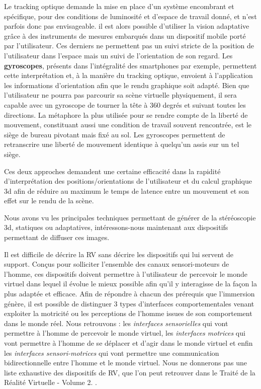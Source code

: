 Le tracking optique demande la mise en place d'un système encombrant et spécifique, pour des conditions de luminosité et d'espace de travail donné, et n'est parfois donc pas envisageable. il est alors possible d'utiliser la vision adaptative grâce à des instruments de mesures embarqués dans un dispositif mobile porté par l'utilisateur. Ces derniers ne permettent pas un suivi stricte de la position de l'utilisateur dans l'espace mais un suivi de l'orientation de son regard. Les \textbf{gyroscopes}, présents dans l'intégralité des smartphones par exemple, permettent cette interprétation et, à la manière du tracking optique, envoient à l'application les informations d'orientation afin que le rendu graphique soit adapté. Bien que l'utilisateur ne pourra pas parcourir sa scène virtuelle physiquement, il sera capable avec un gyroscope de tourner la tête à 360 degrés et suivant toutes les directions. La métaphore la plus utilisée pour se rendre compte de la liberté de mouvement, constituant aussi une condition de travail souvent rencontrée, est le siège de bureau pivotant mais fixé au sol. Les gyroscopes permettent de retranscrire une liberté de mouvement identique à quelqu'un assis sur un tel siège. 

Ces deux approches demandent une certaine efficacité dans la rapidité d'interprétation des positions/orientations de l'utilisateur et du calcul graphique 3d afin de réduire au maximum le temps de latence entre un mouvement et son effet sur le rendu de la scène.  

Nous avons vu les principales techniques permettant de générer de la stéréoscopie 3d, statiques ou adaptatives, intéressons-nous maintenant aux dispositifs permettant de diffuser ces images.

 \label{dispositifs_RV}


Il est difficile de décrire la RV sans décrire les dispositifs qui lui servent de support. Conçus pour solliciter l'ensemble des canaux sensori-moteurs de l'homme, ces dispositifs doivent permettre à l'utilisateur de percevoir le monde virtuel dans lequel il évolue le mieux possible afin qu'il y interagisse de la façon la plus adaptée et efficace.
Afin de répondre à chacun des prérequis que l'immersion génère, il est possible de distinguer 3 types d'interfaces comportementales venant exploiter la motricité ou les perceptions de l'homme issues de son comportement dans le monde réel.
Nous retrouvons : les \textit{interfaces sensorielles} qui vont permettre à l'homme de percevoir le monde virtuel, les \textit{interfaces motrices} qui vont permettre à l'homme de se déplacer et d'agir dans le monde virtuel et enfin les \textit{interfaces sensori-motrices} qui vont permettre une communication bidirectionnelle entre l'homme et le monde virtuel.
Nous ne donnerons pas une liste exhaustive des dispositifs de RV, que l'on peut retrouver dans le Traité de la Réalité Virtuelle - Volume 2. \cite{fuchs2006traite}.

